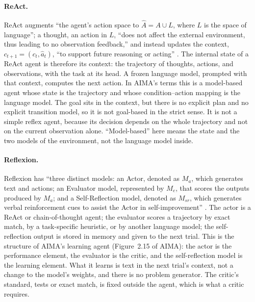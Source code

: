 \paragraph{ReAct.}
ReAct augments ``the agent's action space to $\hat{A} = A \cup L$, where $L$ is the space of language''; a thought, an action in $L$, ``does not affect the external environment, thus leading to no observation feedback,'' and instead updates the context, $c_{t+1} = (c_t, \hat{a}_t)$, ``to support future reasoning or acting'' \citep[\S2]{yao2023react}.
The internal state of a ReAct agent is therefore its context: the trajectory of thoughts,
actions, and observations, with the task at its head. A frozen language model, prompted with
that context, computes the next action. In AIMA's terms this is a model-based agent whose state
is the trajectory and whose condition--action mapping is the language model. The goal sits in
the context, but there is no explicit plan and no explicit transition model, so it is not
goal-based in the strict sense. It is not a simple reflex agent, because its decision depends on
the whole trajectory and not on the current observation alone. ``Model-based'' here means the
state and the two models of the environment, not the language model inside.

\paragraph{Reflexion.}
Reflexion has ``three distinct models: an Actor, denoted as $M_a$, which generates text and actions; an Evaluator model, represented by $M_e$, that scores the outputs produced by $M_a$; and a Self-Reflection model, denoted as $M_{sr}$, which generates verbal reinforcement cues to assist the Actor in self-improvement'' \citep[\S3]{shinn2023reflexion}.
The actor is a ReAct or chain-of-thought agent; the evaluator scores a trajectory by exact match,
by a task-specific heuristic, or by another language model; the self-reflection output is stored
in memory and given to the next trial. This is the structure of AIMA's learning agent
(Figure~2.15 of AIMA): the actor is the performance element, the evaluator is the
critic, and the self-reflection model is the learning element. What it learns is text in the
next trial's context, not a change to the model's weights, and there is no problem generator.
The critic's standard, tests or exact match, is fixed outside the agent, which is what a critic
requires.

